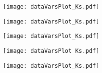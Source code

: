 \begin{figure}[H]
	\ContinuedFloat
\begin{subfigure}{0.5\linewidth}
	\texttt{[image: dataVarsPlot\_Ks.pdf]}
\end{subfigure}
\begin{subfigure}{0.5\linewidth}
	\texttt{[image: dataVarsPlot\_Ks.pdf]}
\end{subfigure}
\begin{subfigure}{0.5\linewidth}
	\texttt{[image: dataVarsPlot\_Ks.pdf]}
\end{subfigure}
\begin{subfigure}{0.5\linewidth}
	\texttt{[image: dataVarsPlot\_Ks.pdf]}
\end{subfigure}
\end{figure}

\begin{figure}[H]
	\ContinuedFloat
	\begin{subfigure}{0.5\linewidth}
		\texttt{[image: dataVarsPlot\_Ks.pdf]}
	\end{subfigure}
\end{figure}


